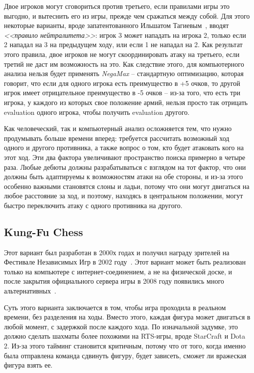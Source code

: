 \documentclass{article}
\begin{document}
Двое игроков могут сговориться против третьего, если правилами игры это выгодно,
и вытеснить его из игры, прежде чем сражаться между собой.
Для этого некоторые варианты, вроде запатентованного Ильшатом Тагиевым~\cite{triad-chess},
вводят \emph{<<правило нейтралитета>>}:
игрок 3 может нападать на игрока 2, только если 2 нападал на 3 на предыдущем ходу,
или если 1 не нападал на 2. 
Как результат этого правила, двое игроков не могут скоординировать атаку на третьего,
если третий не даст им возможность на это. 
Как следствие этого, для компьютерного анализа нельзя будет применять \emph{NegaMax} --
стандартную оптимизацию, которая говорит, что если для одного игрока есть преимущество в +5 очков,
то другой игрок имеет отрицательное преимущество в -5 очков -- 
из-за того, что есть три игрока, у каждого из которых свое положение армий,
нельзя просто так отрицать evaluation одного игрока, 
чтобы получить evaluation другого.

Как человеческий, так и компьютерный анализ осложняется тем, что нужно продумывать больше времени вперед:
требуется рассчитать возможный ход одного и другого противника, а также
вопрос о том, кто будет атаковать кого на этот ход. 
Эти два фактора увеличивают пространство поиска примерно в четыре раза. 
Любые дебюты должны разрабатываться с взглядом на тот фактор,
что они должны быть адаптируемы к возможностям атаки на обе стороны,
и из-за этого особенно важными становятся слоны и ладьи,
потому что они могут двигаться на любое расстояние за ход,
и поэтому, находясь в центральном положении,
могут быстро переключить атаку с одного противника на другого.


\subsection{Kung-Fu Chess}

Этот вариант был разработан в 2000х годах
и получил награду зрителей на Фестивале Независимых Игр в 2002 году~\cite{igf-kungfuchess}.
Этот вариант может быть реализован только на компьютере с интернет-соединением,
а не на физической доске,
и после закрытия официального сервера игры в 2008 году
появились много альтернативных~\cite{kfchess}.

Суть этого варианта заключается в том, 
чтобы игра проходила в реальном времени,
без разделения на ходы. 
Вместо этого, каждая фигура может двигаться в любой момент,
с задержкой после каждого хода.
По изначальной задумке, это должно сделать шахматы более похожими на
RTS-игры, вроде StarCraft и Dota 2.
Из-за этого тайминг становится критичным,
потому что от того, когда именно была отправлена команда сдвинуть фигуру,
будет зависеть, сможет ли вражеская фигура взять ее.
\end{document}
